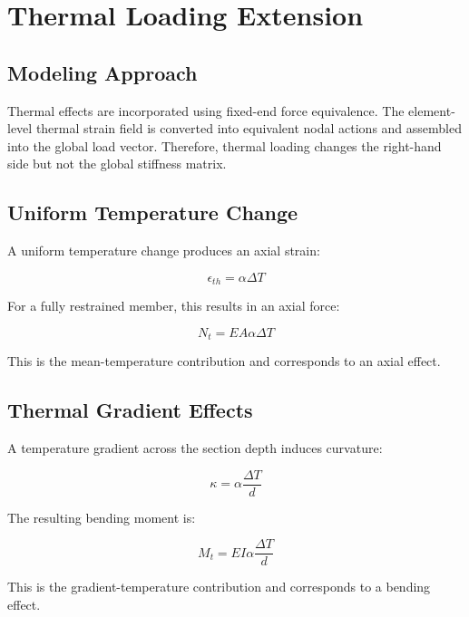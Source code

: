 \pagebreak
\section{Thermal Loading Extension}

\subsection{Modeling Approach}

Thermal effects are incorporated using fixed-end force equivalence. The element-level thermal strain field is converted into equivalent nodal actions and assembled into the global load vector. Therefore, thermal loading changes the right-hand side but not the global stiffness matrix.

\subsection{Uniform Temperature Change}

A uniform temperature change produces an axial strain:

\begin{equation}
\epsilon_{th} = \alpha \Delta T
\end{equation}

For a fully restrained member, this results in an axial force:

\begin{equation}
N_t = E A \alpha \Delta T
\end{equation}

This is the mean-temperature contribution and corresponds to an axial effect.

\subsection{Thermal Gradient Effects}

A temperature gradient across the section depth induces curvature:

\begin{equation}
\kappa = \alpha \frac{\Delta T}{d}
\end{equation}

The resulting bending moment is:

\begin{equation}
M_t = E I \alpha \frac{\Delta T}{d}
\end{equation}

This is the gradient-temperature contribution and corresponds to a bending effect.


